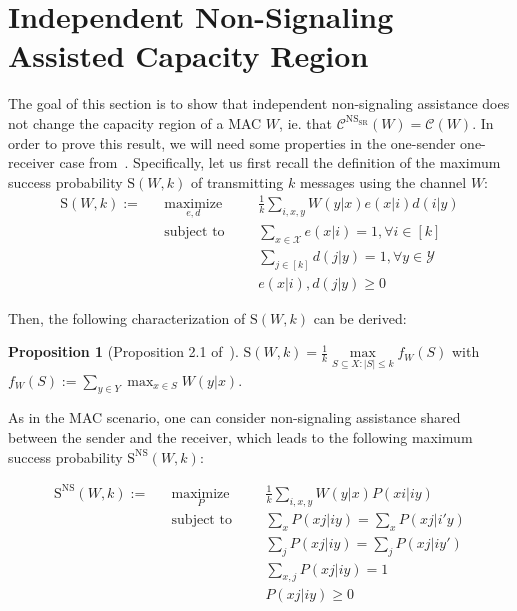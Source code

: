 \documentclass[11pt]{article}
\theoremstyle{definition}
\newtheorem{prop}[theo]{Proposition}
\theoremstyle{remark}
\DeclareMathOperator{\maxi}{\text{maximize}}
\DeclareMathOperator{\st}{\text{subject to}}
\begin{document}
  \section{Independent Non-Signaling Assisted Capacity Region}
  \label{section:NSsr}
The goal of this section is to show that independent non-signaling assistance does not change the capacity region of a MAC $W$, ie. that $\mathcal{C}^{\mathrm{NS}_{\mathrm{SR}}}(W)=\mathcal{C}(W)$. In order to prove this result, we will need some properties in the one-sender one-receiver case from~\cite{BF18}. Specifically, let us first recall the definition of the maximum success probability $\mathrm{S}(W,k)$ of transmitting $k$ messages using the channel $W$:
\begin{equation}
  \begin{aligned}
    \mathrm{S}(W,k) := &&\underset{e,d}{\maxi} &&& \frac{1}{k} \sum_{i,x,y} W(y|x)e(x|i)d(i|y)\\
    &&\st &&& \sum_{x \in \mathcal{X}} e(x|i) = 1, \forall i \in [k]\\
    &&&&& \sum_{j \in [k]} d(j|y) = 1, \forall y \in \mathcal{Y}\\
    &&&&& e(x|i), d(j|y) \geq 0
  \end{aligned}
\end{equation}

Then, the following characterization of $\mathrm{S}(W,k)$ can be derived:

\begin{prop}[Proposition 2.1 of~\cite{BF18}]
  $\mathrm{S}(W,k) = \frac{1}{k} \underset{S \subseteq X: |S| \leq k}{\max} f_W(S)$ with $f_W(S) := \sum_{y \in Y} \max_{x \in S} W(y|x)$.
\end{prop}

As in the MAC scenario, one can consider non-signaling assistance shared between the sender and the receiver, which leads to the following maximum success probability $\mathrm{S}^{\mathrm{NS}}(W,k)$:

\begin{equation}
  \begin{aligned}
    \mathrm{S}^{\mathrm{NS}}(W,k) := &&\underset{P}{\maxi} &&& \frac{1}{k} \sum_{i,x,y} W(y|x)P(xi|iy)\\
    &&\st &&& \sum_{x} P(xj|iy) = \sum_{x} P(xj|i'y)\\
    &&&&& \sum_{j} P(xj|iy) = \sum_{j} P(xj|iy')\\
    &&&&& \sum_{x,j} P(xj|iy) = 1\\
    &&&&& P(xj|iy) \geq 0
  \end{aligned}
\end{equation}
\end{document}
